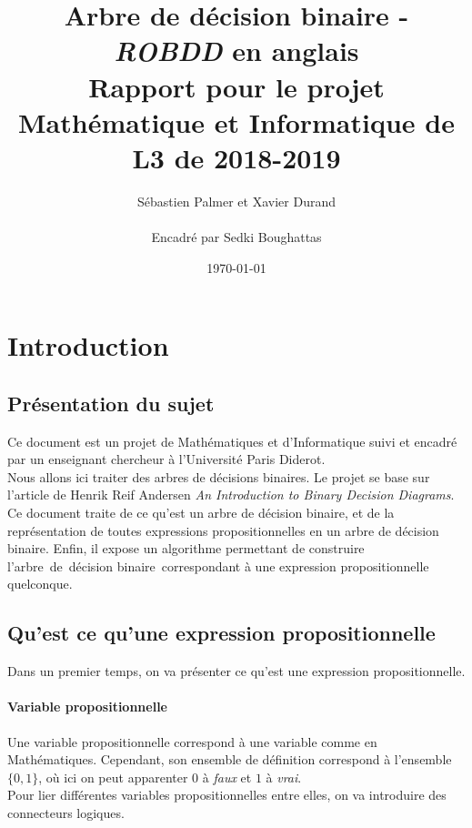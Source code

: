 \documentclass[a4paper, oneside]{report}
\newcommand{\adb}{arbre~de~décision binaire~}
\begin{document}
\title{Arbre de décision binaire - \textit{ROBDD} en anglais \\ Rapport pour le projet Mathématique et Informatique de L3 de 2018-2019  }
\date{\today}
\author{Sébastien Palmer et Xavier Durand \\~\\ Encadré par Sedki Boughattas }
\maketitle

\tableofcontents{}

\newpage

\chapter*{Introduction}

\section*{Présentation du sujet}
Ce document est un projet de Mathématiques et d'Informatique suivi et encadré par un enseignant chercheur à l'Université Paris Diderot.\\
Nous allons ici traiter des arbres de décisions binaires. Le projet se base sur l'article de Henrik Reif Andersen \og\textit{An Introduction to Binary Decision Diagrams}\fg{}.\\
Ce document traite de ce qu'est un arbre de décision binaire, et de la représentation de toutes expressions propositionnelles en un arbre de décision binaire. Enfin, il expose un algorithme permettant de construire l'\adb correspondant à une expression propositionnelle quelconque.\\

\section*{Qu'est ce qu'une expression propositionnelle}

Dans un premier temps, on va présenter ce qu'est une expression propositionnelle.\\
\subsubsection*{Variable propositionnelle}
Une variable propositionnelle correspond à une variable comme en Mathématiques. Cependant, son ensemble de définition correspond à l'ensemble $\{0,1\}$, où ici on peut apparenter $0$ à \textit{faux} et $1$ à \textit{vrai}.\\
Pour lier différentes variables propositionnelles entre elles, on va introduire des connecteurs logiques.
\end{document}
